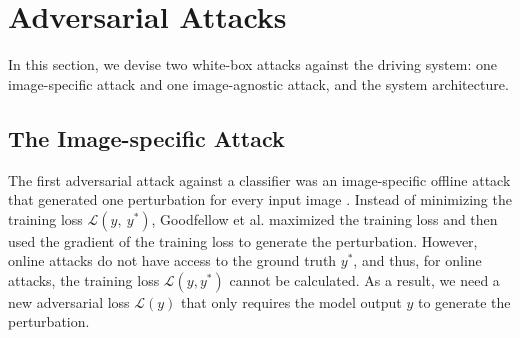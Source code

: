 
\section{Adversarial Attacks} 

In this section, we devise two white-box attacks against the driving system: one image-specific attack and one image-agnostic attack, and the system architecture. 


\subsection{The Image-specific Attack}

The first adversarial attack against a classifier was an image-specific offline attack that generated one perturbation for every input image \citep{GoodfellowSS14}. Instead of minimizing the training loss $\mathcal{L}(y,\ y^{*})$, Goodfellow et al. maximized the training loss and then used the gradient of the training loss to generate the perturbation. However, online attacks do not have access to the ground truth $y^{*}$, and thus, for online attacks, the training loss $\mathcal{L}(y, y^{*})$ cannot be calculated. As a result, we need a new adversarial loss $\mathcal{L}(y)$ that only requires the model output $y$ to generate the perturbation.

